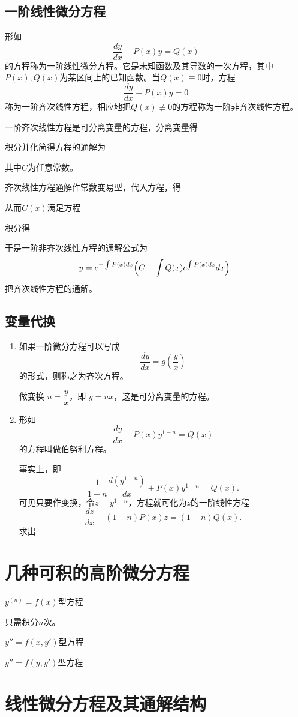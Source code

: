 \subsection{一阶线性微分方程}

形如
\[
\frac{dy}{dx}+P(x)y=Q(x)
\]
的方程称为一阶线性微分方程。它是未知函数及其导数的一次方程，其中$P(x),Q(x)$为某区间上的已知函数。当$Q(x)\equiv0$时，方程
\[
\frac{dy}{dx}+P(x)y=0
\]
称为一阶齐次线性方程，相应地把$Q(x)\not\equiv0$的方程称为一阶非齐次线性方程。

一阶齐次线性方程是可分离变量的方程，分离变量得

积分并化简得方程的通解为

其中$C$为任意常数。

齐次线性方程通解作常数变易型，代入方程，得

从而$C(x)$满足方程

积分得

于是一阶非齐次线性方程的通解公式为
\[
y=e^{-\int P(x)dx}\Bigl(C+\int Q(x)e^{\int P(x)dx}dx\Bigr).
\]
把齐次线性方程的通解。

\subsection{变量代换}
\begin{enumerate}
    \item 如果一阶微分方程可以写成
\[
\frac{dy}{dx}=g\left(\frac{y}{x}\right)
\]
的形式，则称之为齐次方程。

做变换 $u=\dfrac{y}{x}$，即 $y=ux$，这是可分离变量的方程。

    \item 形如
\[
\frac{dy}{dx}+P(x)y^{1-n}=Q(x)
\]
的方程叫做伯努利方程。

事实上，即
\[
\frac{1}{1-n}\frac{d(y^{1-n})}{dx}+P(x)y^{1-n}=Q(x).
\]
可见只要作变换，令$z=y^{1-n}$，方程就可化为$z$的一阶线性方程
\[
\frac{dz}{dx}+(1-n)P(x)z=(1-n)Q(x).
\]
求出
\end{enumerate}

\section{几种可积的高阶微分方程}

$y^{(n)}=f(x)$型方程

只需积分$n$次。

$y''=f(x,y')$型方程

$y''=f(y,y')$型方程

\section{线性微分方程及其通解结构}

